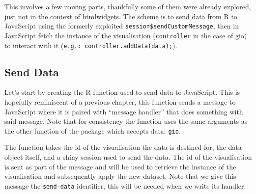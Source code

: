 \documentclass[
]{krantz}
\makeatletter
\newenvironment{Shaded}{\begin{snugshade}}{\end{snugshade}}
\newcommand{\CommentTok}[1]{\textcolor[rgb]{0.37,0.37,0.37}{\textit{#1}}}
\newcommand{\ControlFlowTok}[1]{\textcolor[rgb]{0.27,0.27,0.27}{\textbf{#1}}}
\newcommand{\DataTypeTok}[1]{\textcolor[rgb]{0.27,0.27,0.27}{#1}}
\newcommand{\KeywordTok}[1]{\textcolor[rgb]{0.27,0.27,0.27}{\textbf{#1}}}
\newcommand{\NormalTok}[1]{#1}
\newcommand{\OperatorTok}[1]{\textcolor[rgb]{0.43,0.43,0.43}{\textbf{#1}}}
\newcommand{\StringTok}[1]{\textcolor[rgb]{0.5,0.5,0.5}{#1}}
\newenvironment{kframe}{%
\medskip{}
\setlength{\fboxsep}{.8em}
 \def\at@end@of@kframe{}%
 \ifinner\ifhmode%
  \def\at@end@of@kframe{\end{minipage}}%
  \begin{minipage}{\columnwidth}%
 \fi\fi%
 \def\FrameCommand##1{\hskip\@totalleftmargin \hskip-\fboxsep
 \colorbox{shadecolor}{##1}\hskip-\fboxsep
     \hskip-\linewidth \hskip-\@totalleftmargin \hskip\columnwidth}%
 \MakeFramed {\advance\hsize-\width
   \@totalleftmargin\z@ \linewidth\hsize
   \@setminipage}}%
 {\par\unskip\endMakeFramed%
 \at@end@of@kframe}
\renewenvironment{Shaded}{\begin{kframe}}{\end{kframe}}
\makeatother
\begin{document}
This involves a few moving parts, thankfully some of them were already explored, just not in the context of htmlwidgets. The scheme is to send data from R to JavaScript using the formerly exploited \texttt{session\$sendCustomMessage}, then in JavaScript fetch the instance of the visualisation (\texttt{controller} in the case of gio) to interact with it (\texttt{e.g.:\ controller.addData(data);}).

\hypertarget{send-data}{%
\subsection{Send Data}\label{send-data}}

Let's start by creating the R function used to send data to JavaScript. This is hopefully reminiscent of a previous chapter, this function sends a message to JavaScript where it is paired with ``message handler'' that does something with said message. Note that for consistency the function uses the same arguments as the other function of the package which accepts data: \texttt{gio}.

\begin{Shaded}
\end{Shaded}

The function takes the id of the visualisation the data is destined for, the data object itself, and a shiny session used to send the data. The id of the visualisation is sent as part of the message and will be used to retrieve the instance of the visualisation and subsequently apply the new dataset. Note that we give this message the \texttt{send-data} identifier, this will be needed when we write its handler.
\end{document}
